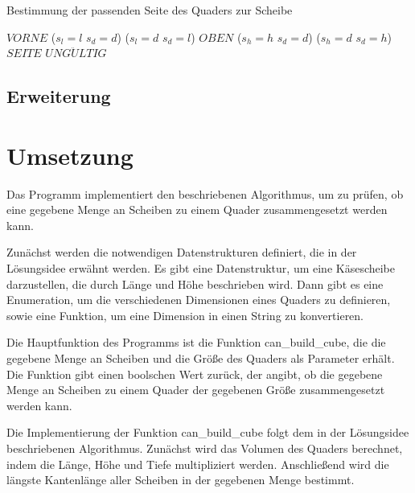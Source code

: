 \documentclass[a4paper,10pt,ngerman]{scrartcl}
\begin{document}
    \begin{algorithm}[H]
        \caption{Bestimmung der passenden Seite des Quaders zur Scheibe}
        \label{alg:cheese2}
        \begin{algorithmic}
                    \State \Return $VORNE$
                \ElsIf
                        {($s_{l} = l$ \land $s_{d} = d$) \lor ($s_{l} = d$ \land $s_{d} = l$)}
                    \State \Return $OBEN$
                \ElsIf
                        {($s_{h} = h$ \land $s_{d} = d$) \lor ($s_{h} = d$ \land $s_{d} = h$)}
                    \State \Return $SEITE$
                \Else
                    \State \Return $UNG\ddot ULTIG$
                \EndIf
            \EndFunction
        \end{algorithmic}
    \end{algorithm}

    \subsection{Erweiterung}\label{subsec:erweiterung_losungsidee}

    \newpage


    \section{Umsetzung}\label{sec:umsetzung}

    Das Programm implementiert den beschriebenen Algorithmus, um zu prüfen, ob eine gegebene Menge an Scheiben zu einem Quader zusammengesetzt werden kann.

    Zunächst werden die notwendigen Datenstrukturen definiert, die in der Lösungsidee erwähnt werden.
    Es gibt eine Datenstruktur, um eine Käsescheibe darzustellen, die durch Länge und Höhe beschrieben wird.
    Dann gibt es eine Enumeration, um die verschiedenen Dimensionen eines Quaders zu definieren, sowie eine Funktion, um eine Dimension in einen String zu konvertieren.

    Die Hauptfunktion des Programms ist die Funktion can_build_cube, die die gegebene Menge an Scheiben und die Größe des Quaders als Parameter erhält.
    Die Funktion gibt einen boolschen Wert zurück, der angibt, ob die gegebene Menge an Scheiben zu einem Quader der gegebenen Größe zusammengesetzt werden kann.

    Die Implementierung der Funktion can_build_cube folgt dem in der Lösungsidee beschriebenen Algorithmus.
    Zunächst wird das Volumen des Quaders berechnet, indem die Länge, Höhe und Tiefe multipliziert werden.
    Anschließend wird die längste Kantenlänge aller Scheiben in der gegebenen Menge bestimmt.
\end{document}
